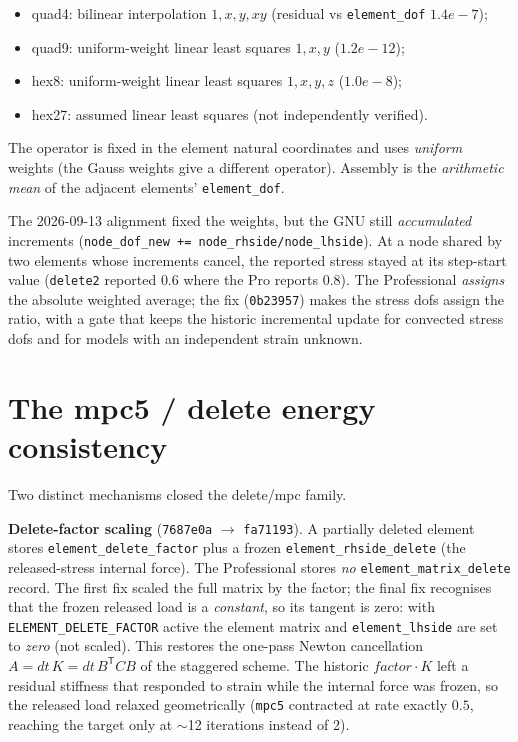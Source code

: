 \documentclass[11pt,a4paper]{report}
\newcommand{\code}[1]{\texttt{#1}}
\begin{document}
\begin{itemize}
  \item quad4: bilinear interpolation $1, x, y, xy$ (residual vs
        \code{element\_\allowbreak dof} $1.4e-7$);
  \item quad9: uniform-weight linear least squares $1, x, y$ ($1.2e-12$);
  \item hex8: uniform-weight linear least squares $1, x, y, z$ ($1.0e-8$);
  \item hex27: assumed linear least squares (not independently verified).
\end{itemize}

The operator is fixed in the element natural coordinates and uses \emph{uniform}
weights (the Gauss weights give a different operator). Assembly is the
\emph{arithmetic mean} of the adjacent elements' \code{element\_\allowbreak dof}.

The 2026-09-13 alignment fixed the weights, but the GNU still \emph{accumulated}
increments (\code{node\_\allowbreak dof\_\allowbreak new += node\_\allowbreak rhside/\allowbreak node\_\allowbreak lhside}). At a node shared by
two elements whose increments cancel, the reported stress stayed at its
step-start value (\code{delete2} reported $0.6$ where the Pro reports $0.8$). The
Professional \emph{assigns} the absolute weighted average; the fix
(\code{0b23957}) makes the stress dofs assign the ratio, with a gate that keeps
the historic incremental update for convected stress dofs and for models with an
independent strain unknown.

\section{The mpc5 / delete energy consistency}
\label{sec:mpc5}

Two distinct mechanisms closed the delete/mpc family.

\textbf{Delete-factor scaling} (\code{7687e0a} $\rightarrow$ \code{fa71193}). A
partially deleted element stores \code{element\_\allowbreak delete\_\allowbreak factor} plus a frozen
\code{element\_\allowbreak rhside\_\allowbreak delete} (the released-stress internal force). The
Professional stores \emph{no} \code{element\_\allowbreak matrix\_\allowbreak delete} record. The first fix
scaled the full matrix by the factor; the final fix recognises that the frozen
released load is a \emph{constant}, so its tangent is zero: with
\code{ELEMENT\_\allowbreak DELETE\_\allowbreak FACTOR} active the element matrix and \code{element\_\allowbreak lhside}
are set to \emph{zero} (not scaled). This restores the one-pass Newton
cancellation $A = dt\,K = dt\,B^{\mathsf{T}} C B$ of the staggered scheme. The
historic $\mathit{factor}\cdot K$ left a residual stiffness that responded to
strain while the internal force was frozen, so the released load relaxed
geometrically (\code{mpc5} contracted at rate exactly $0.5$, reaching the target
only at $\sim$12 iterations instead of 2).
\end{document}

